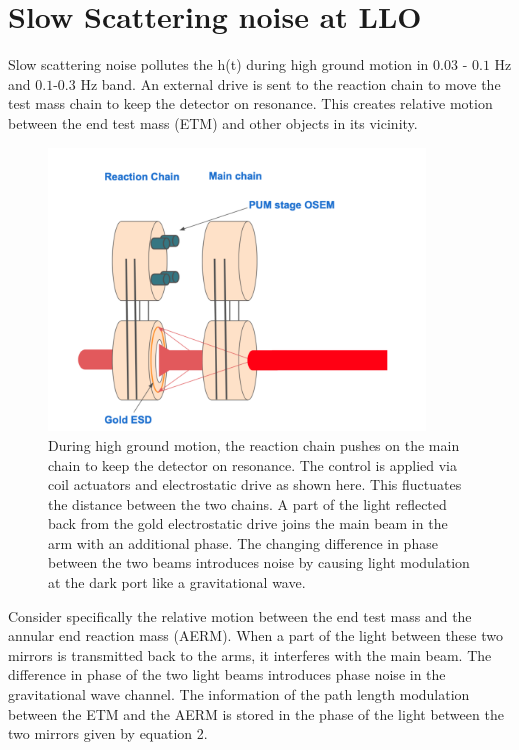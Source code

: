 \documentclass[12pt]{iopart}
\begin{document}
\section{Slow Scattering noise at LLO}\label{m0r0_scattering}
Slow scattering noise pollutes the h(t) during high ground motion in $0.03$ - $0.1$ Hz and $0.1$-$0.3$ Hz band. An external drive is sent to the reaction chain to move the test mass chain to keep the detector on resonance. This creates relative motion between the end test mass (ETM) and other objects in its vicinity. 

\begin{figure}[h]
    \centering
    \includegraphics[width=10cm]{mirror-diagram1.eps}
    \caption{During high ground motion, the reaction chain pushes on the main chain  to keep the detector on resonance. The control is applied via coil actuators and electrostatic drive as shown here. This fluctuates the distance between the two chains. A part of the light reflected back from the gold electrostatic drive joins the main beam in the arm with an additional phase. The changing difference in phase between the two beams introduces noise by causing light modulation at the dark port like a gravitational wave.}
    \label{fig:mirror_diag}
\end{figure}

Consider specifically the relative motion between the end test mass and the annular end reaction mass (AERM).
When a part of the light between these two mirrors is transmitted back to the arms, it interferes with the main beam. The difference in phase of the two light beams introduces phase noise in the gravitational wave channel. The information of the path length modulation between the ETM and the AERM is stored in the phase of the light between the two mirrors given by equation 2.
\end{document}
